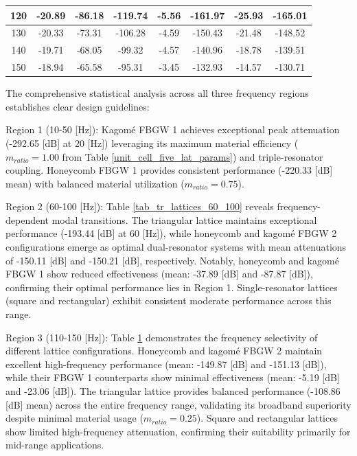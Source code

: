 \documentclass[review,numbers,sort&compress]{elsarticle}
\begin{document}
{\begin{table}[htb]
\begin{tabular}{cccccccc}
        120        & -20.89            & -86.18                  & -119.74               & -5.56                & -161.97                 & -25.93                & -165.01               \\ \hline
        130        & -20.33            & -73.31                  & -106.28               & -4.59                & -150.43                 & -21.48                & -148.52               \\ \hline
        140        & -19.71            & -68.05                  & -99.32                & -4.57                & -140.96                 & -18.78                & -139.51               \\ \hline
        150        & -18.94            & -65.58                  & -95.31                & -3.45                & -132.93                 & -14.57                & -130.71               \\ \hline
    \end{tabular}
    \label{tab_tr_lattices_110_150}
\end{table}

The comprehensive statistical analysis across all three frequency regions establishes clear design guidelines:

Region 1 (10-50 [Hz]): Kagomé FBGW 1 achieves exceptional peak attenuation (-292.65 [dB] at 20 [Hz]) leveraging its maximum material efficiency ($m_{ratio} = 1.00$ from Table \ref{unit_cell_five_lat_params}) and triple-resonator coupling. Honeycomb FBGW 1 provides consistent performance (-220.33 [dB] mean) with balanced material utilization ($m_{ratio} = 0.75$).

Region 2 (60-100 [Hz]): Table \ref{tab_tr_lattices_60_100} reveals frequency-dependent modal transitions. The triangular lattice maintains exceptional performance (-193.44 [dB] at 60 [Hz]), while honeycomb and kagomé FBGW 2 configurations emerge as optimal dual-resonator systems with mean attenuations of -150.11 [dB] and -150.21 [dB], respectively. Notably, honeycomb and kagomé FBGW 1 show reduced effectiveness (mean: -37.89 [dB] and -87.87 [dB]), confirming their optimal performance lies in Region 1. Single-resonator lattices (square and rectangular) exhibit consistent moderate performance across this range.

Region 3 (110-150 [Hz]): Table \ref{tab_tr_lattices_110_150} demonstrates the frequency selectivity of different lattice configurations. Honeycomb and kagomé FBGW 2 maintain excellent high-frequency performance (mean: -149.87 [dB] and -151.13 [dB]), while their FBGW 1 counterparts show minimal effectiveness (mean: -5.19 [dB] and -23.06 [dB]). The triangular lattice provides balanced performance (-108.86 [dB] mean) across the entire frequency range, validating its broadband superiority despite minimal material usage ($m_{ratio} = 0.25$). Square and rectangular lattices show limited high-frequency attenuation, confirming their suitability primarily for mid-range applications.

}
\end{document}

